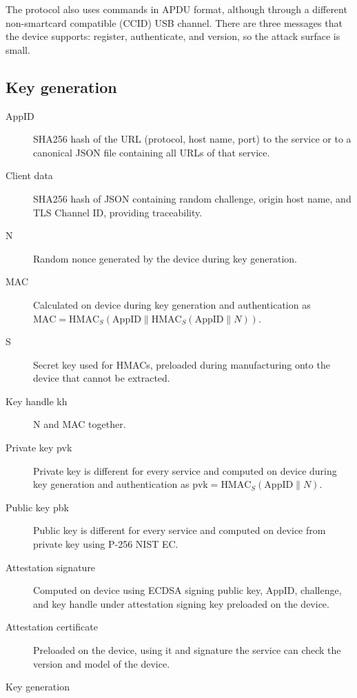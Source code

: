 \documentclass[a4paper]{article}
\newcommand{\conc}{\mathbin{\|}}
\begin{document}
The protocol also uses commands in APDU format, although through a different non-smartcard compatible (CCID) USB channel. There are three messages that the device supports: register, authenticate, and version, so the attack surface is small.


\subsection{Key generation}

\begin{description}
	\item[AppID] SHA256 hash of the URL (protocol, host name, port) to the service or to a canonical JSON file containing all URLs of that service.
	\item[Client data] SHA256 hash of JSON containing random challenge, origin host name, and TLS Channel ID, providing traceability.
	\item[N] Random nonce generated by the device during key generation.
	\item[MAC] Calculated on device during key generation and authentication as
	$\text{MAC} = \text{HMAC}_S(\text{AppID}\conc\text{HMAC}_S(\text{AppID}\conc N))$.
	\item[S] Secret key used for HMACs, preloaded during manufacturing onto the device that cannot be extracted.
	\item[Key handle kh] N and MAC together.
	\item[Private key pvk] Private key is different for every service and computed on device during key generation and authentication as
	$\text{pvk}=\text{HMAC}_S(\text{AppID}\conc N)$.
	\item[Public key pbk] Public key is different for every service and computed on device from private key using P-256 NIST EC.
	\item[Attestation signature] Computed on device using ECDSA signing public key, AppID, challenge, and key handle under attestation signing key preloaded on the device.
	\item[Attestation certificate] Preloaded on the device, using it and signature the service can check the version and model of the device.
\end{description}

\begin{msc}{Key generation}
\nextlevel
{}
\nextlevel
{}
\nextlevel[2]
\nextlevel
{}
\nextlevel
{}
\nextlevel[2]
\end{msc}
\end{document}
